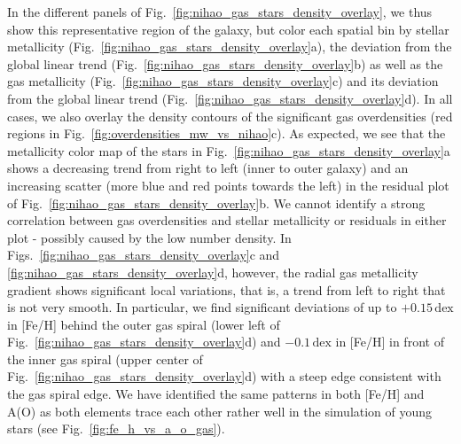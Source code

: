 \documentclass[twocolumn,apj,numberedappendix,appendixfloats,twocolappendix]{openjournal}
\begin{document}
\begin{CJK*}{UTF8}{gbsn}
In the different panels of Fig.~\ref{fig:nihao_gas_stars_density_overlay}, we thus show this representative region of the galaxy, but color each spatial bin by stellar metallicity (Fig.~\ref{fig:nihao_gas_stars_density_overlay}a), the deviation from the global linear trend (Fig.~\ref{fig:nihao_gas_stars_density_overlay}b) as well as the gas metallicity (Fig.~\ref{fig:nihao_gas_stars_density_overlay}c) and its deviation from the global linear trend (Fig.~\ref{fig:nihao_gas_stars_density_overlay}d). In all cases, we also overlay the density contours of the significant gas overdensities (red regions in Fig.~\ref{fig:overdensities_mw_vs_nihao}c). As expected, we see that the metallicity color map of the stars in Fig.~\ref{fig:nihao_gas_stars_density_overlay}a shows a decreasing trend from right to left (inner to outer galaxy) and an increasing scatter (more blue and red points towards the left) in the residual plot of Fig.~\ref{fig:nihao_gas_stars_density_overlay}b. We cannot identify a strong correlation between gas overdensities and stellar metallicity or residuals in either plot - possibly caused by the low number density. In Figs.~\ref{fig:nihao_gas_stars_density_overlay}c and \ref{fig:nihao_gas_stars_density_overlay}d, however, the radial gas metallicity gradient shows significant local variations, that is, a trend from left to right that is not very smooth. In particular, we find significant deviations of up to $+0.15\,\mathrm{dex}$ in [Fe/H] behind the outer gas spiral (lower left of Fig.~\ref{fig:nihao_gas_stars_density_overlay}d) and $-0.1\,\mathrm{dex}$ in [Fe/H] in front of the inner gas spiral (upper center of Fig.~\ref{fig:nihao_gas_stars_density_overlay}d) with a steep edge consistent with the gas spiral edge. We have identified the same patterns in both [Fe/H] and A(O) as both elements trace each other rather well in the simulation of young stars (see Fig.~\ref{fig:fe_h_vs_a_o_gas}).


\end{CJK*}
\end{document}
